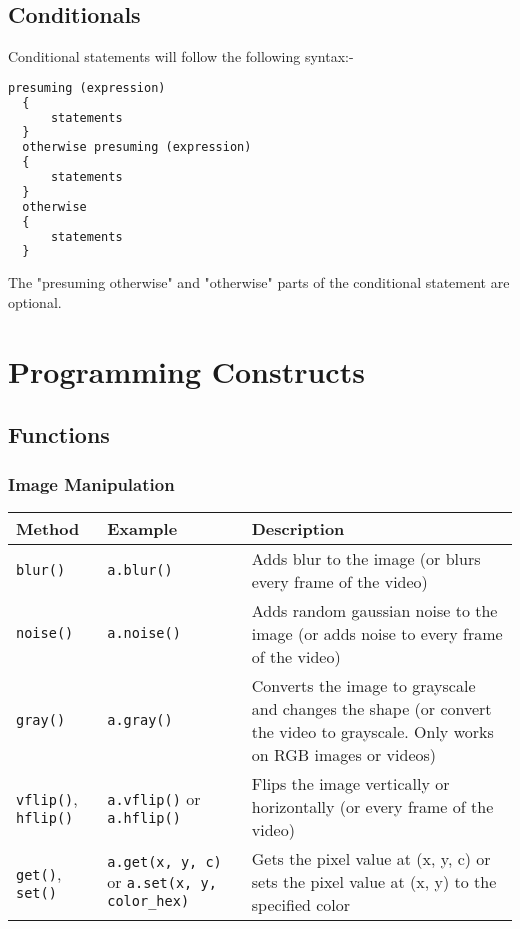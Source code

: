 \documentclass[a4paper, 11pt]{article}
\begin{document}
    \subsection{Conditionals}

    Conditional statements will follow the following syntax:-
    \begin{lstlisting}[language=Python]
  presuming (expression)
  {
      statements
  } 
  otherwise presuming (expression)
  {
      statements
  }
  otherwise
  {
      statements
  }\end{lstlisting}

    The "presuming otherwise" and "otherwise" parts of the conditional statement are optional.

\section{Programming Constructs}
    \subsection{Functions}
          \subsubsection{Image Manipulation}
          
          \begin{tabular}{ |p{4cm}|p{5cm}|p{7cm}|  }
            \hline
            \textbf{Method} & \textbf{Example} & \textbf{Description}\\ 
            \hline
            \texttt{blur()} & \texttt{a.blur()} & Adds blur to the image (or blurs every frame of the video) \\ \hline
            \texttt{noise()} & \texttt{a.noise()} & Adds random gaussian noise to the image (or adds noise to every frame of the video) \\ \hline
            \texttt{gray()} & \texttt{a.gray()} & Converts the image to grayscale and changes the shape (or convert the video to grayscale. Only works on RGB images or videos) \\ \hline
            \texttt{vflip()}, \texttt{hflip()} & \texttt{a.vflip()} or \texttt{a.hflip()}& Flips the image vertically or horizontally (or every frame of the video) \\ \hline
            \texttt{get()}, \texttt{set()} & \texttt{a.get(x, y, c)} or \texttt{a.set(x, y, color\_hex)} & Gets the pixel value at (x, y, c) or sets the pixel value at (x, y) to the specified color \\ \hline
           \end{tabular}
\end{document}
